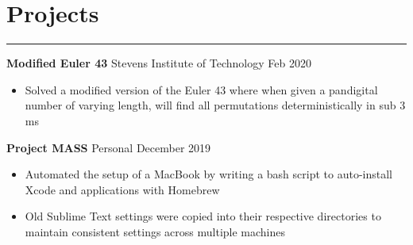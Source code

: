 \documentclass[10pt]{article}
\newcommand{\resumesection}[1]{\vspace{-0.2cm}\section*{#1}\vspace{-0.2cm}\hrule\vspace{0.2cm}}
\begin{document}
%


\resumesection{Projects}

\textbf{Modified Euler 43} Stevens Institute of Technology \hfill Feb 2020\par
\begin{itemize}
	\item Solved a modified version of the Euler 43 where when given a pandigital number of varying length, will find all permutations deterministically in sub 3 ms
\end{itemize}

\textbf{Project MASS} Personal \hfill December 2019\par
\begin{itemize}
	\item Automated the setup of a MacBook by writing a bash script to auto-install Xcode and applications with Homebrew
	\item Old Sublime Text settings were copied into their respective directories to maintain consistent settings across multiple machines
\end{itemize}
\end{document}
